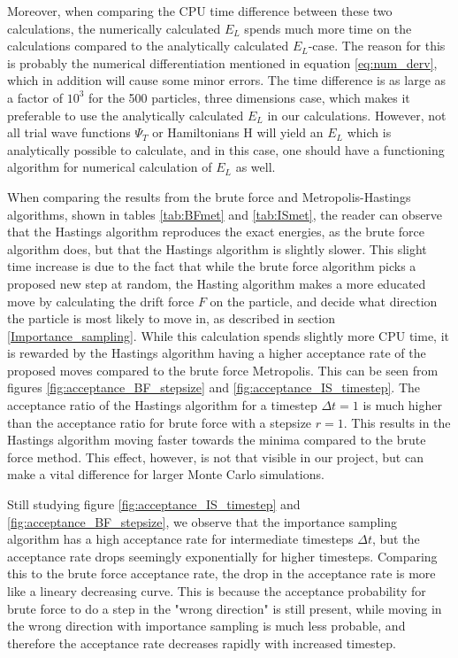 \documentclass[norsk,a4paper,12pt]{article}
\begin{document}
Moreover, when comparing the CPU time difference between these two calculations, the numerically calculated $E_L$ spends much more time on the calculations compared to the analytically calculated $E_L$-case. The reason for this is probably the numerical differentiation mentioned in equation \ref{eq:num_derv}, which in addition will cause some minor errors. The time difference is as large as a factor of $10^3$ for the 500 particles, three dimensions case, which makes it preferable to use the analytically calculated $E_L$ in our calculations. However, not all trial wave functions $\Psi_T$ or Hamiltonians H will yield an $E_L$ which is analytically possible to calculate, and in this case, one should have a functioning algorithm for numerical calculation of $E_L$ as well.
\par 
\vspace{3mm}

When comparing the results from the brute force and Metropolis-Hastings algorithms, shown in tables \ref{tab:BFmet} and \ref{tab:ISmet}, the reader can observe that the Hastings algorithm reproduces the exact energies, as the brute force algorithm does, but that the Hastings algorithm is slightly slower. This slight time increase is due to the fact that while the brute force algorithm picks a proposed new step at random, the Hasting algorithm makes a more educated move by calculating the drift force $F$ on the particle, and decide what direction the particle is most likely to move in, as described in section \ref{Importance_sampling}. While this calculation spends slightly more CPU time, it is rewarded by the Hastings algorithm having a higher acceptance rate of the proposed moves compared to the brute force Metropolis. This can be seen from figures \ref{fig:acceptance_BF_stepsize} and \ref{fig:acceptance_IS_timestep}. The acceptance ratio of the Hastings algorithm for a timestep $\Delta t=1$ is much higher than the acceptance ratio for brute force with a stepsize $r=1$. This results in the Hastings algorithm moving faster towards the minima compared to the brute force method. This effect, however, is not that visible in our project, but can make a vital difference for larger Monte Carlo simulations.
\par 
\vspace{3mm}

Still studying figure \ref{fig:acceptance_IS_timestep} and \ref{fig:acceptance_BF_stepsize}, we observe that the importance sampling algorithm has a high acceptance rate for intermediate timesteps $\Delta t$, but the acceptance rate drops seemingly exponentially for higher timesteps. Comparing this to the brute force acceptance rate, the drop in the acceptance rate is more like a lineary decreasing curve. This is because the acceptance probability for brute force to do a step in the "wrong direction" is still present, while moving in the wrong direction with importance sampling is much less probable, and therefore the acceptance rate decreases rapidly with increased timestep.
\par 
\vspace{3mm}
\end{document}
